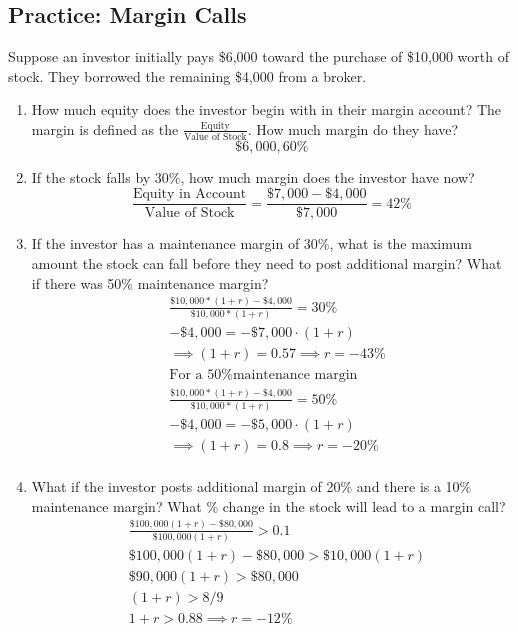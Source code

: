 \documentclass[11pt]{article}
\theoremstyle{definition}
\begin{document}
    \begin{shaded}
        \subsection{Practice: Margin Calls}
            Suppose an investor initially pays \$6,000 toward the purchase of \$10,000 worth of stock.   They borrowed the remaining \$4,000 from a broker.  
    \begin{enumerate}
        \item How much equity does the investor begin with in their margin account?   The margin is defined as the $\frac{\text{Equity}}{\text{Value of Stock}}$.   How much margin do they have?\\
            $$\$6,000, 60\%$$
        \item If the stock falls by 30\%, how much margin does the investor have now?\\
            $$\frac{\text{Equity in Account}}{\text{Value of Stock}} = \frac{\$7,000 - \$4,000}{\$7,000} = 42\%$$
        \item If the investor has a maintenance margin of 30\%, what is the maximum amount the stock can fall before they need to post additional margin?   What if there was 50\% maintenance margin?
            \begin{align*}
                &\frac{\$10,000 * (1+r) - \$4,000}{\$10,000 * (1+r)} = 30\% \\
                & -\$4,000 = -\$7,000 \cdot (1+r) \\
                & \implies (1+r) = 0.57 \implies r = -43\%\\
                &\text{For a 50\% maintenance margin}\\
                &\frac{\$10,000 * (1+r) - \$4,000}{\$10,000 * (1+r)} = 50\% \\
                & -\$4,000 = -\$5,000 \cdot (1+r) \\
                & \implies (1+r) = 0.8 \implies r = -20\%\\
            \end{align*}  
        \item What if the investor posts additional margin of 20\% and there is a 10\% maintenance margin?   What \% change in the stock will lead to a margin call?
            \begin{align*}
                &\frac{\$100,000(1+r) - \$80,000}{\$100,000(1+r)} > 0.1\\
                &\$100,000(1+r) - \$80,000 > \$10,000(1+r) \\
                &\$90,000(1+r) > \$80,000\\
                & (1+r) > 8/9\\
                & 1+r > 0.88 \implies r = -12\%
            \end{align*}
    \end{enumerate}

    \end{shaded}
\end{document}
